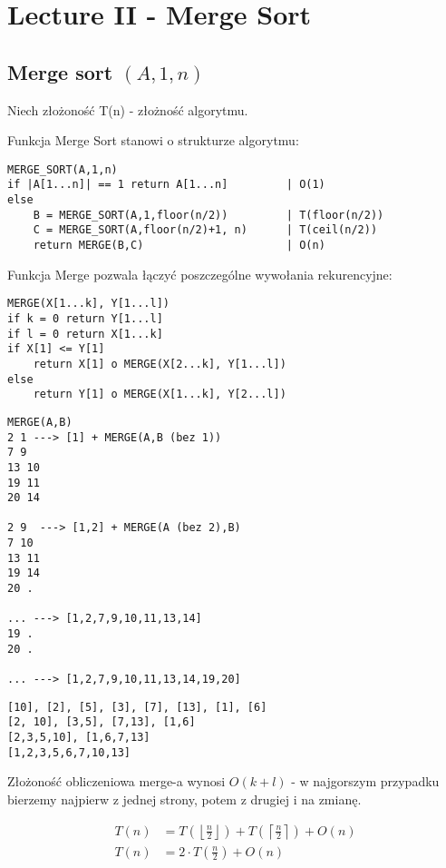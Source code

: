\documentclass{article}
\numberwithin{equation}{subsection}
\begin{document}
\section{Lecture II - Merge Sort}

\subsection{Merge sort $(A,1,n)$}

Niech złożoność T(n) - złożność algorytmu.

\noindent
Funkcja Merge Sort stanowi o strukturze algorytmu:
\begin{verbatim}
MERGE_SORT(A,1,n)
if |A[1...n]| == 1 return A[1...n]         | O(1)
else                                   
    B = MERGE_SORT(A,1,floor(n/2))         | T(floor(n/2))
    C = MERGE_SORT(A,floor(n/2)+1, n)      | T(ceil(n/2))
    return MERGE(B,C)                      | O(n)
\end{verbatim}

\noindent
Funkcja Merge pozwala łączyć poszczególne wywołania rekurencyjne:
\begin{verbatim}
MERGE(X[1...k], Y[1...l])
if k = 0 return Y[1...l]
if l = 0 return X[1...k]
if X[1] <= Y[1]
    return X[1] o MERGE(X[2...k], Y[1...l])
else   
    return Y[1] o MERGE(X[1...k], Y[2...l])
\end{verbatim}

\begin{verbatim}
MERGE(A,B)
2 1 ---> [1] + MERGE(A,B (bez 1))
7 9
13 10
19 11
20 14
  
2 9  ---> [1,2] + MERGE(A (bez 2),B)
7 10
13 11
19 14
20 .

... ---> [1,2,7,9,10,11,13,14]
19 .
20 .

... ---> [1,2,7,9,10,11,13,14,19,20]
\end{verbatim}

\begin{verbatim}
[10], [2], [5], [3], [7], [13], [1], [6]
[2, 10], [3,5], [7,13], [1,6]
[2,3,5,10], [1,6,7,13]
[1,2,3,5,6,7,10,13]
\end{verbatim}

\noindent
Złożoność obliczeniowa merge-a wynosi $O(k+l)$ - w najgorszym przypadku bierzemy najpierw z jednej strony, potem z drugiej i na zmianę.

\begin{align}
    T(n) &= T\left(\left\lfloor \frac{n}{2} \right\rfloor\right) + T\left(\left\lceil \frac{n}{2} \right\rceil\right) + O(n)\\
    T(n) &= 2\cdot T\left(\frac{n}{2}\right) + O(n)
\end{align}
\end{document}
